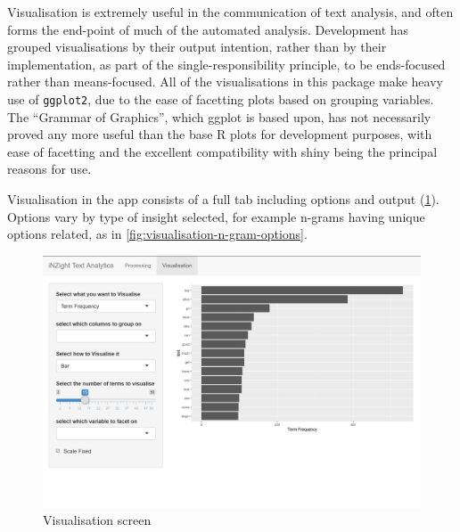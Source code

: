 \documentclass[11pt, a4paper, twoside, titlepage]{report}
\begin{document}
Visualisation is extremely useful in the communication of text
analysis, and often forms the end-point of much of the automated
analysis. Development has grouped visualisations by their output
intention, rather than by their implementation, as part of the
single-responsibility principle, to be ends-focused rather than
means-focused. All of the visualisations in this package make heavy
use of \texttt{ggplot2}, due to the ease of facetting plots
based on grouping variables. The ``Grammar of Graphics'', which ggplot
is based upon, has not necessarily proved any more useful than the
base R plots for development purposes, with ease of facetting and the
excellent compatibility with shiny being the principal reasons for
use.

Visualisation in the app consists of a full tab including options and
output (\cref{fig:visualisation-overview}). Options vary by type of
insight selected, for example n-grams having unique options related,
as in \cref{fig:visualisation-n-gram-options}.

\begin{figure}
\centering
\includegraphics[scale=0.35]{visualisation-overview.png}
\caption{Visualisation screen\label{fig:visualisation-overview}}
\end{figure}
\end{document}

